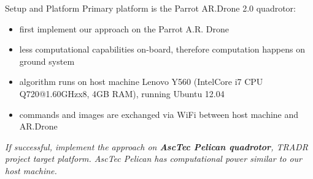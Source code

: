 \documentclass[8pt]{beamer}
\begin{document}
\begin{frame}{Setup and Platform}
Primary platform is the Parrot AR.Drone 2.0 quadrotor: 
\bigskip
  \begin{itemize}
    \setlength\itemsep{1em}
    \item first implement our approach on the Parrot A.R. Drone
    \item less computational capabilities on-board, therefore computation happens on ground system
    \item algorithm runs on host machine \textendash Lenovo Y560 (Intel\textregistered Core i7 CPU Q720@1.60GHzx8, 4GB RAM), running Ubuntu 12.04
    \item commands and images are exchanged via WiFi between host machine and AR.Drone
  \end{itemize}
\vspace{0.5cm}
\textit{If successful, implement the approach on \textbf{AscTec Pelican quadrotor}, TRADR project target platform.
AscTec Pelican has computational power similar to our host machine.}


\end{frame}
\end{document}
